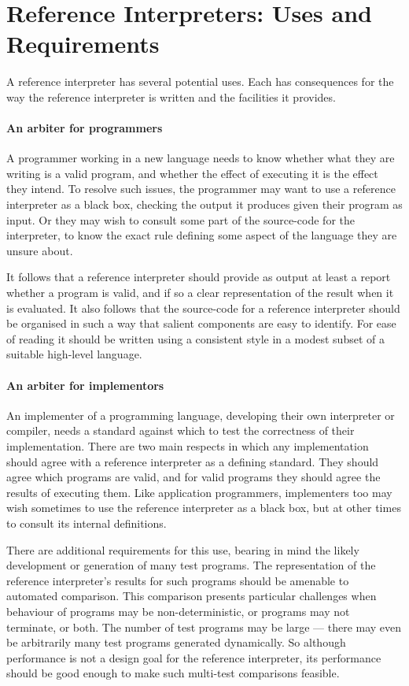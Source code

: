 \section{Reference Interpreters: Uses and Requirements}
\label{sec:usesrequirements}

A reference interpreter has several potential uses.
Each has consequences for the
way the reference interpreter is written and the
facilities it provides.

\paragraph{An arbiter for programmers}
A programmer working in a new language needs to
know whether what they are writing is a valid
program, and whether the effect of executing it
is the effect they intend.
To resolve such issues, the programmer may want to
use a reference interpreter as a black box,
checking the output it produces given their
program as input.
Or they may wish to consult some part of the
source-code for the interpreter, to know the exact
rule defining some aspect of the language they
are unsure about.

It follows that a reference interpreter should
provide as output at least a report whether a
program is valid, and if so a clear representation
of the result when it is evaluated.
It also follows that the source-code for a
reference interpreter should
be organised in such a way that salient components
are easy to identify.
For ease of reading it should be written using a
consistent style in a modest subset of a suitable
high-level language.

\paragraph{An arbiter for implementors}
An implementer of a programming language,
developing their own interpreter or compiler,
needs a standard against which to test the correctness
of their implementation.
There are two main respects in which any
implementation should agree with a reference interpreter
as a defining standard.
They should agree which programs are valid,
and for valid programs they should agree the results
of executing them.
Like application programmers, implementers too may
wish sometimes to use the reference interpreter as
a black box, but at other times to consult its
internal definitions. 

There are additional requirements for this use,
bearing in mind the likely development or generation
of many test programs.
The representation of the
reference interpreter's results for such programs
should be amenable to automated comparison.
This comparison presents particular challenges when
behaviour of programs may be non-deterministic,
or programs may not terminate, or both.
The number of test programs may be large
--- there may even be arbitrarily many test programs generated dynamically.
So although performance is not a design goal for the reference
interpreter, its performance should be good enough to
make such multi-test comparisons feasible.

